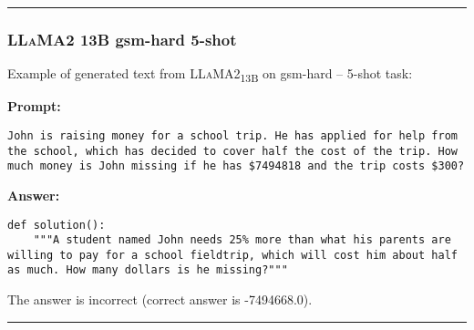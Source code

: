 	\noindent\rule{\textwidth}{0.4pt}

	\subsubsection*{\textsc{LLaMA}2 13B gsm-hard 5-shot}
	\noindent Example of generated text from \textsc{LLaMA}2\textsubscript{13B} on gsm-hard -- 5-shot task:
	\begin{displayquote}
		\textbf{Prompt:}
		\begin{Verbatim}[fontsize=\small,breaklines]
John is raising money for a school trip. He has applied for help from the school, which has decided to cover half the cost of the trip. How much money is John missing if he has $7494818 and the trip costs $300?
	\end{Verbatim}
		\textbf{Answer:}
		\begin{Verbatim}[fontsize=\small,breaklines]
def solution():
    """A student named John needs 25% more than what his parents are willing to pay for a school fieldtrip, which will cost him about half as much. How many dollars is he missing?"""
	\end{Verbatim}
	\end{displayquote}
	The answer is incorrect (correct answer is -7494668.0).

	\noindent\rule{\textwidth}{0.4pt}

